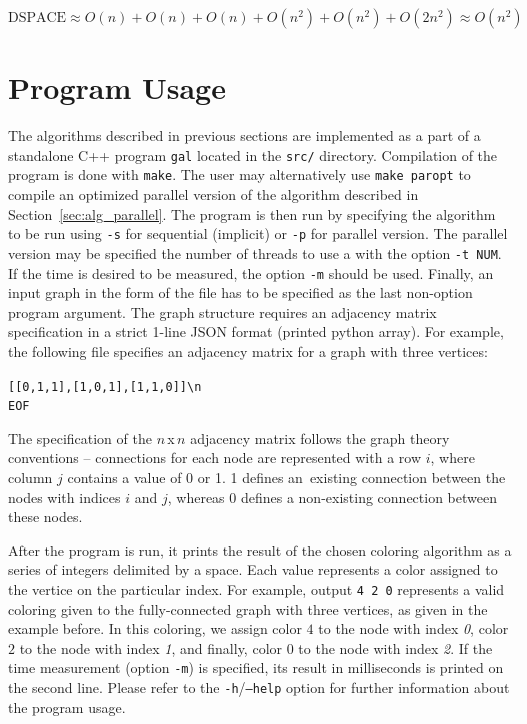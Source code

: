 \documentclass[11pt,a4paper]{article}
\begin{document}
$$\textrm{DSPACE} \approx O(n) + O(n) + O(n) + O(n^2) + O(n^2) + O(2 n^2) \approx O(n^2)$$


\section{Program Usage}
\label{sec:prog_usage}

The algorithms described in previous sections are implemented as a part of a standalone C++ program \texttt{gal} located in the \texttt{src/} directory. Compilation of the program is done with \texttt{make}. The user may alternatively use \texttt{make paropt} to compile an optimized parallel version of the algorithm described in Section~\ref{sec:alg_parallel}. The program is then run by specifying the algorithm to be run using \texttt{-s} for sequential (implicit) or \texttt{-p} for parallel version. The parallel version may be specified the number of threads to use a with the option \texttt{-t NUM}. If the time is desired to be measured, the option \texttt{-m} should be used. Finally, an input graph in the form of the file has to be specified as the last non-option program argument. The graph structure requires an adjacency matrix specification in a strict 1-line JSON format (printed python array). For example, the following file specifies an adjacency matrix for a graph with three vertices:

\noindent \texttt{[[0,1,1],[1,0,1],[1,1,0]]\textbackslash n} \\
\texttt{EOF}
\vspace{0.5em}

The specification of the $n$\,x\,$n$ adjacency matrix follows the graph theory conventions -- connections for each node are represented with a row $i$, where column $j$ contains a value of 0 or 1. 1 defines an~existing connection between the nodes with indices $i$ and $j$, whereas 0 defines a non-existing connection between these nodes.

After the program is run, it prints the result of the chosen coloring algorithm as a series of integers delimited by a space. Each value represents a color assigned to the vertice on the particular index. For example, output \texttt{4 2 0} represents a valid coloring given to the fully-connected graph with three vertices, as given in the example before. In this coloring, we assign color $4$ to the node with index \emph{0}, color $2$ to the node with index \emph{1}, and finally, color $0$ to the node with index \emph{2}. If the time measurement (option \texttt{-m}) is specified, its result in milliseconds is printed on the second line. Please refer to the \texttt{-h}/\texttt{--help} option for further information about the program usage.
\end{document}

